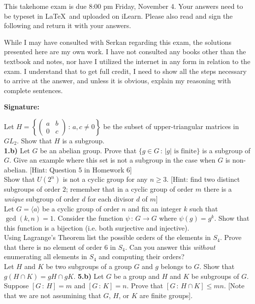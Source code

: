 \documentclass[11pt]{amsart}
\theoremstyle{definition}  %
\begin{document}

\noindent
This takehome exam is due 8:00 pm Friday, November 4. Your answers
need to be typeset in \LaTeX \ and uploaded on iLearn.
Please also read and sign the following and return it  with your answers.

\vskip 3cm
\noindent While I may have consulted with Serkan regarding this exam, the solutions presented here are my own work. I have
not consulted any books other than the textbook and notes, nor  have I utilized the internet in any form in relation to the exam. I understand
that to get full credit, I need to show all the steps necessary to arrive at the answer, and unless it is obvious, explain 
my reasoning with complete sentences.


\vskip 1cm 
   \hspace{7cm}   {\bf Signature:}



\vfill
\eject

 Let $H = \left\{ \left( \begin{array}{cc} a & b \\ 0 & c \end{array} \right) \, : \, a,c \neq 0 \right\}$ be the subset of upper-triangular
matrices in $GL_2$. Show that $H$ is a subgroup.\\
{\bf 1.b)} Let $G$ be an abelian group. Prove that $\{ g \in G \, : \, |g| \mbox{ is finite} \}$ is a subgroup of $G$. Give an example where this set is not a subgroup
in the case when $G$ is non-abelian. [Hint: Question 5 in Homework 6]\\

 Show that $U(2^n)$ is not a cyclic group for any $n \geq 3$. [Hint: find two distinct subgroups of order $2$; remember that in a cyclic
group of order $m$ there is a {\it unique} subgroup of order $d$ for each divisor $d$ of $m$]\\


 Let $G = \langle a \rangle$ be a cyclic group of order $n$ and fix an integer $k$ such that $\gcd(k,n) = 1$. Consider the function
$\psi \, : \, G \longrightarrow G$ where $\psi(g) = g^k$. Show that this function is a bijection (i.e. both surjective and injective).  \\


 Using Lagrange's Theorem list the possible orders of the elements in $S_4$. Prove that there is no element of order $6$ in $S_4$.
Can you answer this {\it without}
enumerating all elements in $S_4$ and computing their orders? \\
  

 Let $H$ and $K$ be two subgroups of a group $G$ and $g$ belongs to $G$. Show that $g(H \cap K) = gH \cap gK$.
{\bf 5.b)} Let $G$ be a group and $H$ and $K$ be subgroups of $G$. Suppose $[G \, : \,H] = m$ and $[G \, : \, K] = n$. Prove that $[G \, : \, H\cap K] \leq mn$.
[Note that we are not assumining that $G$, $H$, or $K$ are finite groups].
\end{document}
